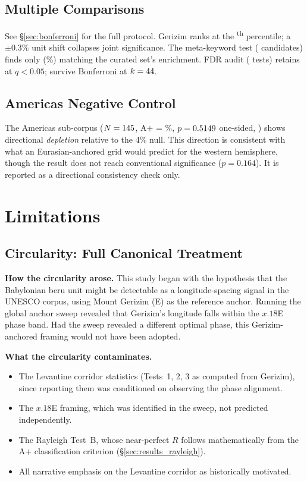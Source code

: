 \documentclass[HARVARD,twocolumn]{USG}
\begin{document}
\subsection{Multiple Comparisons}
\label{sec:sharpshooter}

See \S\ref{sec:bonferroni} for the full protocol.
Gerizim ranks at the \anchorSweepPctile{}\textsuperscript{th} percentile;
a $\pm 0.3\%$ unit shift collapses joint significance.
The meta-keyword test (\NmetaKeywords{} candidates) finds only \NmetaBeatingChi{} (\metaBeatingChiPct\%)
matching the curated set's enrichment.
FDR audit (\NtotalTests{} tests) retains \NsurviveFDR{} at $q < 0.05$;
\NsurviveBonfAll{} survive Bonferroni at $k = 44$.

\subsection{Americas Negative Control}
\label{sec:americas_control}

The Americas sub-corpus ($N = 145$, A+ = \AmericasApRate\%, $p = 0.5149$
one-sided, \AmericasOneSidedStar) shows directional \emph{depletion}
relative to the 4\% null. This direction is consistent with what an
Eurasian-anchored grid would predict for the western hemisphere, though the
result does not reach conventional significance ($p = 0.164$). 
It is reported as a directional consistency check only.

\section{Limitations}
\label{sec:limitations}

\subsection{Circularity: Full Canonical Treatment}
\label{sec:limitations_circularity}

\textbf{How the circularity arose.}
This study began with the hypothesis that the Babylonian beru unit might be
detectable as a longitude-spacing signal in the UNESCO corpus, using Mount
Gerizim (\GerizimLon\textdegree{}E) as the reference anchor.
Running the global anchor sweep revealed that Gerizim's longitude
falls within the $x.18$\textdegree{}E phase band.
Had the sweep revealed a different optimal phase, this Gerizim-anchored
framing would not have been adopted.

\textbf{What the circularity contaminates.}
\begin{itemize}
  \item The Levantine corridor statistics (Tests~1, 2, 3 as computed from
    Gerizim), since reporting them was conditioned on observing the phase alignment.
  \item The $x.18$\textdegree{}E framing, which was identified in the sweep,
    not predicted independently.
  \item The Rayleigh Test~B, whose near-perfect $R$ follows mathematically
    from the A+ classification criterion (\S\ref{sec:results_rayleigh}).
  \item All narrative emphasis on the Levantine corridor as historically motivated.
\end{itemize}
\end{document}
